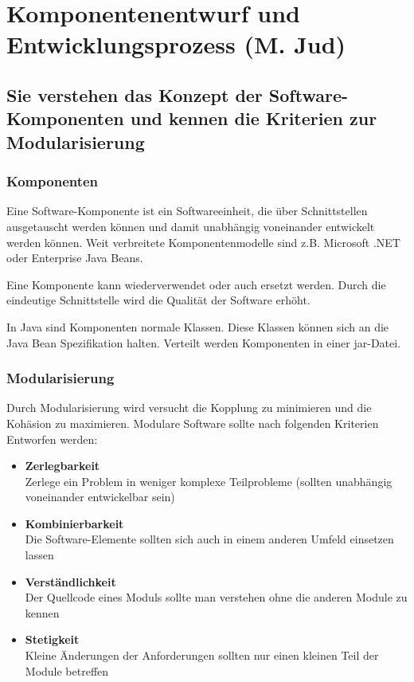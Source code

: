 \section{Komponentenentwurf und Entwicklungsprozess (M. Jud)}
\label{sec:jud}

\subsection{Sie verstehen das Konzept der Software-Komponenten und kennen die Kriterien zur Modularisierung}

\subsubsection{Komponenten}

Eine Software-Komponente ist ein Softwareeinheit, die über Schnittstellen ausgetauscht werden können und damit unabhängig voneinander entwickelt werden können. Weit verbreitete Komponentenmodelle sind z.B. Microsoft .NET oder Enterprise Java Beans.

Eine Komponente kann wiederverwendet oder auch ersetzt werden. Durch die eindeutige Schnittstelle wird die Qualität der Software erhöht. 

In Java sind Komponenten normale Klassen. Diese Klassen können sich an die Java Bean Spezifikation halten. Verteilt werden Komponenten in einer jar-Datei.

\subsubsection{Modularisierung}

Durch Modularisierung wird versucht die Kopplung zu minimieren und die Kohäsion zu maximieren. Modulare Software sollte nach folgenden Kriterien Entworfen werden:

\begin{itemize}
	\item \textbf{Zerlegbarkeit} \\
		  Zerlege ein Problem in weniger komplexe Teilprobleme (sollten unabhängig voneinander entwickelbar sein)
	\item \textbf{Kombinierbarkeit} \\
		  Die Software-Elemente sollten sich auch in einem anderen Umfeld einsetzen lassen
	\item \textbf{Verständlichkeit} \\
		  Der Quellcode eines Moduls sollte man verstehen ohne die anderen Module zu kennen
	\item \textbf{Stetigkeit} \\
		  Kleine Änderungen der Anforderungen sollten nur einen kleinen Teil der Module betreffen
\end{itemize}

